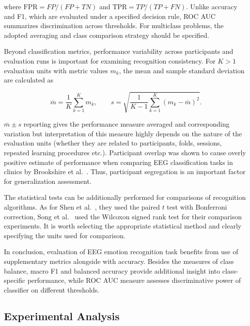 \documentclass[ASNA,twocolumn]{USG}
\begin{document}
where $\mathrm{FPR}=FP/(FP+TN)$ and $\mathrm{TPR}=TP/(TP+FN)$. Unlike accuracy and F1, which are evaluated under a specified decision rule, ROC AUC summarizes discrimination across thresholds. For multiclass problems, the adopted averaging and class comparison strategy should be specified.

Beyond classification metrics, performance variability across participants and evaluation runs is important for examining recognition consistency. For $K>1$ evaluation units with metric values $m_k$, the mean and sample standard deviation are calculated as

\begin{equation}
\overline{m} =
\frac{1}{K}\sum_{k=1}^{K}m_k,
\qquad
s =
\sqrt{
\frac{1}{K-1}
\sum_{k=1}^{K}
(m_k-\overline{m})^2
}.
\label{eq:mean_std}
\end{equation}

$\overline{m}\pm s$ reporting gives the performance measure averaged and corresponding variation but interpretation of this measure highly depends on the nature of the evaluation units (whether they are related to participants, folds, sessions, repeated learning procedures etc.). Participant overlap was shown to cause overly positive estimate of performance when comparing EEG classification tasks in clinics by Brookshire et al.~\cite{brookshire2024data}. Thus, participant segregation is an important factor for generalization assessment.

The statistical tests can be additionally performed for comparisons of recognition algorithms. As for Shen et al.~\cite{shen2022contrastive}, they used the paired $t$ test with Bonferroni correction, Song et al.~\cite{song2022eeg} used the Wilcoxon signed rank test for their comparison experiments. It is worth selecting the appropriate statistical method and clearly specifying the units used for comparison.

In conclusion, evaluation of EEG emotion recognition task benefits from use of supplementary metrics alongside with accuracy. Besides the measures of class balance, macro F1 and balanced accuracy provide additional insight into class-specific performance, while ROC AUC measure assesses discriminative power of classifier on different thresholds.


\subsection{Experimental Analysis}
\label{subsec:experimental_analysis}
\end{document}

